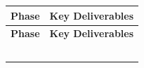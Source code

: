 \documentclass[10pt,letterpaper]{article}
\renewcommand\arraystretch{1.25}
\begin{document}
\begin{center}
\begingroup
\setlength\tabcolsep{2.0pt}
\footnotesize
\renewcommand\arraystretch{1.55}
\begin{longtable}{|>{\raggedright\arraybackslash}p{3.245in}|>{\raggedright\arraybackslash}p{3.245in}|}
\hline
\rowcolor{light}
\textbf{Phase} & \textbf{Key Deliverables} \\ \hline
\endfirsthead
\hline\rowcolor{light} \textbf{Phase} & \textbf{Key Deliverables} \\ \hline
\endhead
\rule{0pt}{11pt}\hspace{0pt} & \rule{0pt}{11pt}\hspace{0pt} \\ \hline
\rule{0pt}{11pt}\hspace{0pt} & \rule{0pt}{11pt}\hspace{0pt} \\ \hline
\rule{0pt}{11pt}\hspace{0pt} & \rule{0pt}{11pt}\hspace{0pt} \\ \hline
\rule{0pt}{11pt}\hspace{0pt} & \rule{0pt}{11pt}\hspace{0pt} \\ \hline
\rule{0pt}{11pt}\hspace{0pt} & \rule{0pt}{11pt}\hspace{0pt} \\ \hline
\end{longtable}
\endgroup
\end{center}
\end{document}
